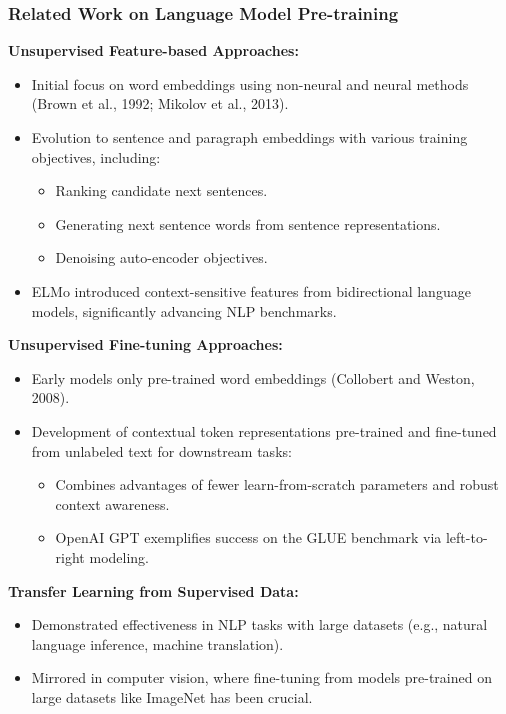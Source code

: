 \documentclass[11pt,xcolor={dvipsnames},hyperref={pdftex,pdfpagemode=UseNone,hidelinks,pdfdisplaydoctitle=true},usepdftitle=false]{beamer}
\begin{document}
\begin{frame}
\frametitle{Related Work on Language Model Pre-training}

\textbf{Unsupervised Feature-based Approaches:}
\begin{itemize}
    \item Initial focus on word embeddings using non-neural and neural methods (Brown et al., 1992; Mikolov et al., 2013).
    \item Evolution to sentence and paragraph embeddings with various training objectives, including:
    \begin{itemize}
        \item Ranking candidate next sentences.
        \item Generating next sentence words from sentence representations.
        \item Denoising auto-encoder objectives.
    \end{itemize}
    \item ELMo introduced context-sensitive features from bidirectional language models, significantly advancing NLP benchmarks.
\end{itemize}

\textbf{Unsupervised Fine-tuning Approaches:}
\begin{itemize}
    \item Early models only pre-trained word embeddings (Collobert and Weston, 2008).
    \item Development of contextual token representations pre-trained and fine-tuned from unlabeled text for downstream tasks:
    \begin{itemize}
        \item Combines advantages of fewer learn-from-scratch parameters and robust context awareness.
        \item OpenAI GPT exemplifies success on the GLUE benchmark via left-to-right modeling.
    \end{itemize}
\end{itemize}

\textbf{Transfer Learning from Supervised Data:}
\begin{itemize}
    \item Demonstrated effectiveness in NLP tasks with large datasets (e.g., natural language inference, machine translation).
    \item Mirrored in computer vision, where fine-tuning from models pre-trained on large datasets like ImageNet has been crucial.
\end{itemize}

\end{frame}
\end{document}
